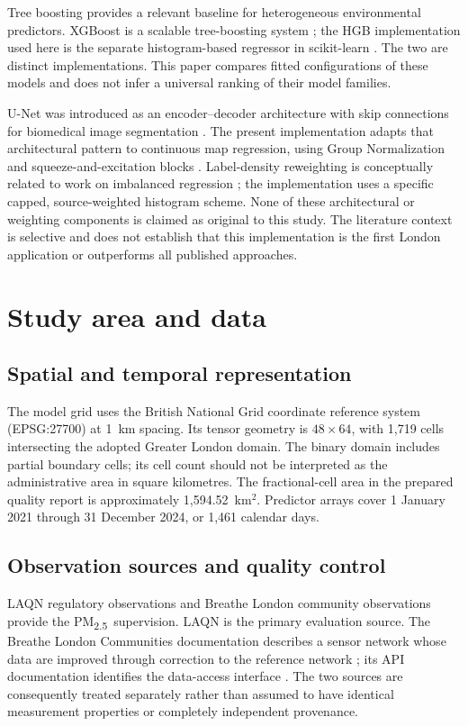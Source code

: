 \documentclass[11pt,a4paper]{article}
\newcommand{\pmfine}{PM\textsubscript{2.5}}
\begin{document}
Tree boosting provides a relevant baseline for heterogeneous environmental
predictors. XGBoost is a scalable tree-boosting system
\citep{chen2016xgboost}; the HGB implementation used here is the separate
histogram-based regressor in scikit-learn \citep{sklearnhgb}. The two are
distinct implementations. This paper compares fitted configurations of these
models and does not infer a universal ranking of their model families.

U-Net was introduced as an encoder--decoder architecture with skip connections
for biomedical image segmentation \citep{ronneberger2015}. The present
implementation adapts that architectural pattern to continuous map regression,
using Group Normalization \citep{wu2018} and squeeze-and-excitation blocks
\citep{hu2017}. Label-density reweighting is conceptually related to work on
imbalanced regression \citep{yang2021}; the implementation uses a specific
capped, source-weighted histogram scheme. None of these architectural or
weighting components is claimed as original to this study. The literature
context is selective and does not establish that this implementation is the
first London application or outperforms all published approaches.

\section{Study area and data}
\subsection{Spatial and temporal representation}
The model grid uses the British National Grid coordinate reference system
(EPSG:27700) at 1~km spacing. Its tensor geometry is $48\times64$, with
1,719 cells intersecting the adopted Greater London domain. The binary domain
includes partial boundary cells; its cell count should not be interpreted as
the administrative area in square kilometres. The fractional-cell area in the
prepared quality report is approximately 1,594.52~km$^2$. Predictor arrays cover
1 January 2021 through 31 December 2024, or 1,461 calendar days.

\subsection{Observation sources and quality control}
LAQN regulatory observations and Breathe London community observations provide
the \pmfine\ supervision. LAQN is the primary evaluation source. The Breathe
London Communities documentation describes a sensor network whose data are
improved through correction to the reference network \citep{breatheabout}; its
API documentation identifies the data-access interface \citep{breatheapi}.
The two sources are consequently treated separately rather than assumed to
have identical measurement properties or completely independent provenance.
\end{document}
